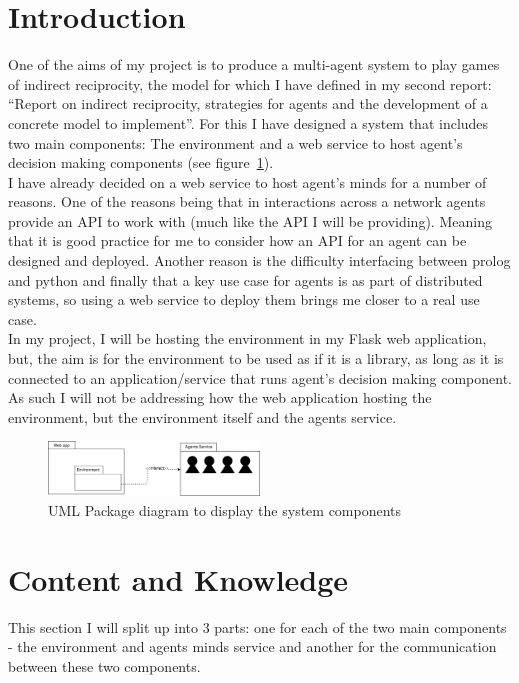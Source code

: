 \documentclass[twoside,twocolumn]{article}
\begin{document}
\section{Introduction}
One of the aims of my project is to produce a multi-agent system to play games of indirect reciprocity, the model for which I have defined in my second report: ``Report on indirect reciprocity, strategies for agents and the development of a concrete model to implement''. For this I have designed a system that includes two main components: The environment and a web service to host agent's decision making components (see figure~\ref{fig:syspackage}).\\
I have already decided on a web service to host agent's minds for a number of reasons. One of the reasons being that in interactions across a network agents provide an API to work with (much like the API I will be providing). Meaning that it is good practice for me to consider how an API for an agent can be designed and deployed. Another reason is the difficulty interfacing between prolog and python and finally that a key use case for agents is as part of distributed systems, so using a web service to deploy them brings me closer to a real use case.\\
In my project, I will be hosting the environment in my Flask web application, but, the aim is for the environment to be used as if it is a library, as long as it is connected to an application/service that runs agent's decision making component. As such I will not be addressing how the web application hosting the environment, but the environment itself and the agents service.
\begin{figure}
	\begin{center}
	\includegraphics[width=0.5\textwidth]{SystemPackage.png}
	\caption{UML Package diagram to display the system components}
	\label{fig:syspackage}
	\end{center}
\end{figure}


\section{Content and Knowledge}
This section I will split up into 3 parts: one for each of the two main components - the environment and agents minds service and another for the communication between these two components.
\end{document}
